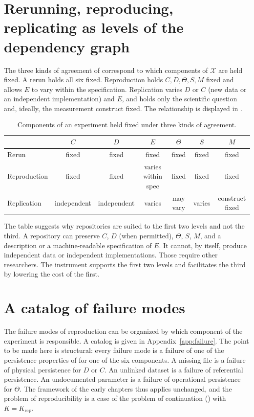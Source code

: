 \documentclass[11pt,twoside,openright]{book}
\theoremstyle{plain}
\theoremstyle{definition}
\theoremstyle{remark}
\begin{document}
\section{Rerunning, reproducing, replicating as levels of the dependency graph}

The three kinds of agreement of  correspond to which components of $\mathcal{X}$ are held fixed. A rerun holds all six fixed. Reproduction holds $C,D,\Theta,S,M$ fixed and allows $E$ to vary within the specification. Replication varies $D$ or $C$ (new data or an independent implementation) and $E$, and holds only the scientific question and, ideally, the measurement construct fixed. The relationship is displayed in .

\begin{table}[t]
\centering
\caption{Components of an experiment held fixed under three kinds of agreement.}
\label{tab:agreement}
\small
\begin{tabular}{lcccccc}
\toprule
 & $C$ & $D$ & $E$ & $\Theta$ & $S$ & $M$ \\
\midrule
Rerun & fixed & fixed & fixed & fixed & fixed & fixed \\
Reproduction & fixed & fixed & varies within spec & fixed & fixed & fixed \\
Replication & independent & independent & varies & may vary & varies & construct fixed \\
\bottomrule
\end{tabular}
\end{table}

The table suggests why repositories are suited to the first two levels and not the third. A repository can preserve $C$, $D$ (when permitted), $\Theta$, $S$, $M$, and a description or a machine-readable specification of $E$. It cannot, by itself, produce independent data or independent implementations. Those require other researchers. The instrument supports the first two levels and facilitates the third by lowering the cost of the first.

\section{A catalog of failure modes}

The failure modes of reproduction can be organized by which component of the experiment is responsible. A catalog is given in Appendix~\ref{app:failure}. The point to be made here is structural: every failure mode is a failure of one of the persistence properties of  for one of the six components. A missing file is a failure of physical persistence for $D$ or $C$. An unlinked dataset is a failure of referential persistence. An undocumented parameter is a failure of operational persistence for $\Theta$. The framework of the early chapters thus applies unchanged, and the problem of reproducibility is a case of the problem of continuation () with $K=K_{\mathrm{rep}}$.
\end{document}
